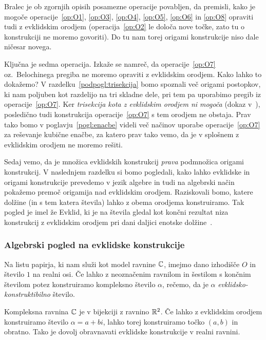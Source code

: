 Bralec je ob zgornjih opisih posamezne operacije povabljen, da premisli, kako je mogoče operacije~\ref{op:O1}, \ref{op:O3}, \ref{op:O4}, \ref{op:O5}, \ref{op:O6} in \ref{op:O8} opraviti tudi z evklidskim orodjem (operacija~\ref{op:O2} le določa nove točke, zato tu o konstrukciji ne moremo govoriti). Do tu nam torej origami konstrukcije niso dale ničesar novega.

Ključna je sedma operacija. Izkaže se namreč, da operacije~\ref{op:O7} oz.\ Belochinega pregiba ne moremo opraviti z evklidskim orodjem. Kako lahko to dokažemo? V razdelku~\ref{podpogl:trisekcija} bomo spoznali več origami postopkov, ki nam poljuben kot razdelijo na tri skladne dele, pri tem pa uporabimo pregib iz operacije~\ref{op:O7}. Ker \emph{trisekcija kota z evklidskim orodjem ni mogoča} (dokaz v~\cite[str.\ 77--78]{jerman1998}), posledično tudi konstrukcija operacije~\ref{op:O7} s tem orodjem ne obstaja. Prav tako bomo v poglavju~\ref{pogl:enacbe} videli več načinov uporabe operacije~\ref{op:O7} za reševanje kubične enačbe, za katero prav tako vemo, da je v splošnem z evklidskim orodjem ne moremo rešiti.

Sedaj vemo, da je množica evklidskih konstrukcij \emph{prava} podmnožica origami konstrukcij. V naslednjem razdelku si bomo pogledali, kako lahko evklidske in origami konstrukcije prevedemo v jezik algebre in tudi na algebrski način pokažemo premoč origamija nad evklidskim orodjem. Raziskovali bomo, katere dolžine (in s tem katera števila) lahko z obema orodjema konstruiramo. Tak pogled je imel že Evklid, ki je na števila gledal kot končni rezultat niza konstrukcij z evklidskim orodjem pri dani daljici enotske dolžine~\cite[str. 164]{michael2005}.

\subsubsection{Algebrski pogled na evklidske konstrukcije}
\label{podpogl:evkl_konstruktibilnost}

\begin{definicija}
    \label{def:evkl_konstr}
    Na listu papirja, ki nam služi kot model ravnine $\mathbb C$, imejmo dano izhodišče $O$ in število $1$ na realni osi. Če lahko z neoznačenim ravnilom in šestilom s končnim številom potez konstruiramo kompleksno število $\alpha$, rečemo, da je $\alpha$ \emph{evklidsko-konstruktibilno} število.
\end{definicija}

Kompleksna ravnina $\mathbb C$ je v bijekciji z ravnino $\mathbb R^2$. Če lahko z evklidskim orodjem konstruiramo število $\alpha = a + bi$, lahko torej konstruiramo točko $(a, b)$ in obratno. Tako je dovolj obravnavati evklidske konstrukcije v realni ravnini.

